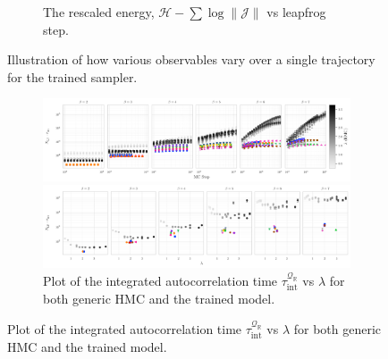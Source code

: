 \documentclass{article} %
\begin{document}
{\begin{figure}[htpb]
\begin{subfigure}{0.31\textwidth}
      \caption{\label{fig:hwf}The rescaled energy, \(\mathcal{H}-\sum\log\|\mathcal{J}\|\) vs leapfrog step.}
   \end{subfigure}
   \hfill
   \caption{\label{fig:transformations}Illustration of how various observables vary over a single trajectory for the
   trained sampler.}
\end{figure}
%
\begin{figure}[htpb]
   \centering
   \begin{subfigure}{\linewidth}
      \includegraphics[width=\linewidth]{figures/autocorr_vs_mc_step.pdf}
      \caption{Plot of the integrated autocorrelation time \(\tau_{\mathrm{int}}^{\mathcal{Q}_{\mathbb{R}}}\) vs
      MC step for both generic HMC and the trained model, for \(\beta = 2, 3, \ldots, 7\) arranged from left to right.}
      \includegraphics[width=\linewidth]{figures/autocorr_vs_traj_len.pdf}
      \caption{Plot of the integrated autocorrelation time \(\tau_{\mathrm{int}}^{\mathcal{Q}_{\mathbb{R}}}\) vs
      \(\lambda\) for both generic HMC and the trained model.}
   \end{subfigure}
\end{figure}
%

}
\end{document}
